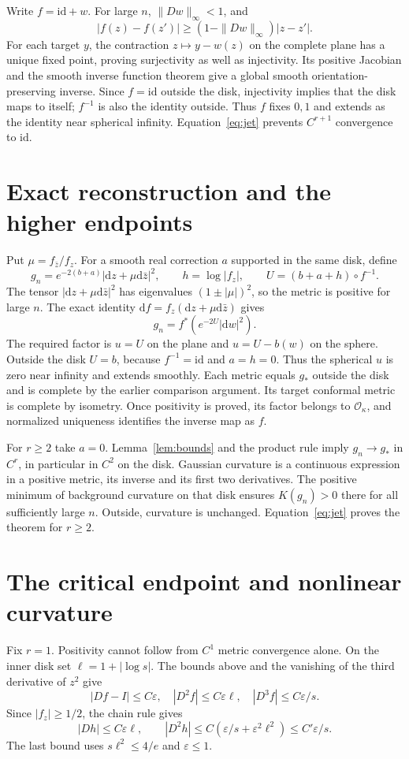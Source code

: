 \documentclass[11pt]{article}
\newcommand{\id}{\mathrm{id}}
\newcommand{\dd}{\mathrm d}
\begin{document}
Write $f=\id+w$. For large $n$, $\|Dw\|_\infty<1$, and
\[
 |f(z)-f(z')|\geq(1-\|Dw\|_\infty)|z-z'|.
\]
For each target $y$, the contraction $z\mapsto y-w(z)$ on the complete plane has a unique fixed point, proving surjectivity as well as injectivity. Its positive Jacobian and the smooth inverse function theorem give a global smooth orientation-preserving inverse. Since $f=\id$ outside the disk, injectivity implies that the disk maps to itself; $f^{-1}$ is also the identity outside. Thus $f$ fixes $0,1$ and extends as the identity near spherical infinity. Equation~\eqref{eq:jet} prevents $C^{r+1}$ convergence to $\id$.

\section{Exact reconstruction and the higher endpoints}
Put $\mu=f_{\bar z}/f_z$. For a smooth real correction $a$ supported in the same disk, define
\begin{equation}\label{eq:metric}
 g_n=e^{-2(b+a)}|\dd z+\mu\dd\bar z|^2,\qquad
 h=\log|f_z|,\qquad U=(b+a+h)\circ f^{-1}.
\end{equation}
The tensor $|\dd z+\mu\dd\bar z|^2$ has eigenvalues $(1\pm|\mu|)^2$, so the metric is positive for large $n$. The exact identity $\dd f=f_z(\dd z+\mu\dd\bar z)$ gives
\[
 g_n=f^*(e^{-2U}|\dd w|^2).
\]
The required factor is $u=U$ on the plane and $u=U-b(w)$ on the sphere. Outside the disk $U=b$, because $f^{-1}=\id$ and $a=h=0$. Thus the spherical $u$ is zero near infinity and extends smoothly. Each metric equals $g_*$ outside the disk and is complete by the earlier comparison argument. Its target conformal metric is complete by isometry. Once positivity is proved, its factor belongs to $\mathcal O_\kappa$, and normalized uniqueness identifies the inverse map as $f$.

For $r\geq2$ take $a=0$. Lemma~\ref{lem:bounds} and the product rule imply $g_n\to g_*$ in $C^r$, in particular in $C^2$ on the disk. Gaussian curvature is a continuous expression in a positive metric, its inverse and its first two derivatives. The positive minimum of background curvature on that disk ensures $K(g_n)>0$ there for all sufficiently large $n$. Outside, curvature is unchanged. Equation~\eqref{eq:jet} proves the theorem for $r\geq2$.

\section{The critical endpoint and nonlinear curvature}
Fix $r=1$. Positivity cannot follow from $C^1$ metric convergence alone. On the inner disk set $\ell=1+|\log s|$. The bounds above and the vanishing of the third derivative of $z^2$ give
\begin{equation}\label{eq:criticalbounds}
 |Df-I|\leq C\varepsilon,\quad |D^2f|\leq C\varepsilon\ell,
 \quad |D^3f|\leq C\varepsilon/s.
\end{equation}
Since $|f_z|\geq1/2$, the chain rule gives
\[
 |Dh|\leq C\varepsilon\ell,\qquad
 |D^2h|\leq C(\varepsilon/s+\varepsilon^2\ell^2)
 \leq C'\varepsilon/s.
\]
The last bound uses $s\ell^2\leq4/e$ and $\varepsilon\leq1$.
\end{document}
